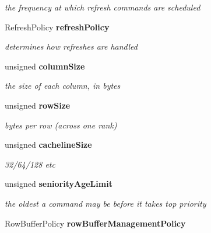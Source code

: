 \begin{DoxyCompactItemize}
\begin{DoxyCompactList}\small\item\em the frequency at which refresh commands are scheduled \item\end{DoxyCompactList}\item 
RefreshPolicy {\bf refreshPolicy}\label{class_d_r_a_msim_i_i_1_1_system_configuration_a8f107a8becebbee1c6f792297cdc2020}

\begin{DoxyCompactList}\small\item\em determines how refreshes are handled \item\end{DoxyCompactList}\item 
unsigned {\bf columnSize}\label{class_d_r_a_msim_i_i_1_1_system_configuration_a1fb6f3d7c6efdcbd25bbdf35f71204f9}

\begin{DoxyCompactList}\small\item\em the size of each column, in bytes \item\end{DoxyCompactList}\item 
unsigned {\bf rowSize}\label{class_d_r_a_msim_i_i_1_1_system_configuration_a2141e7d5594b88348cbec3eee17829d5}

\begin{DoxyCompactList}\small\item\em bytes per row (across one rank) \item\end{DoxyCompactList}\item 
unsigned {\bf cachelineSize}\label{class_d_r_a_msim_i_i_1_1_system_configuration_a3892be18e60da949ed702bc22b6ae8a9}

\begin{DoxyCompactList}\small\item\em 32/64/128 etc \item\end{DoxyCompactList}\item 
unsigned {\bf seniorityAgeLimit}\label{class_d_r_a_msim_i_i_1_1_system_configuration_a96a8cb7630b038cb600e45851d2594b4}

\begin{DoxyCompactList}\small\item\em the oldest a command may be before it takes top priority \item\end{DoxyCompactList}\item 
RowBufferPolicy {\bf rowBufferManagementPolicy}\label{class_d_r_a_msim_i_i_1_1_system_configuration_a47741b7f154444248d9dc0dbd673684b}


\end{DoxyCompactItemize}
